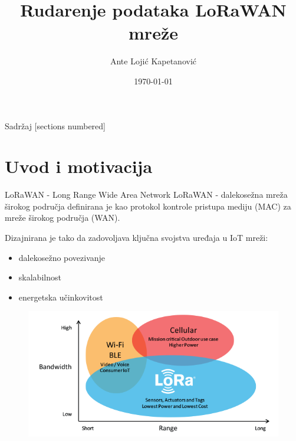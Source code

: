 \documentclass{beamer}
\title{Rudarenje podataka LoRaWAN mreže}
\date{\today}
\author{Ante Lojić Kapetanović}
\institute{FESB, Sveučilište u Splitu}
\begin{document}
  \maketitle

  \begin{frame}{Sadržaj}
    [sections numbered]
    \tableofcontents[hideallsubsections]
  \end{frame}

  \section{Uvod i motivacija}
  \begin{frame}[fragile]{LoRaWAN - Long Range Wide Area Network}
    \alert{LoRaWAN} - dalekosežna mreža širokog područja definirana je kao protokol kontrole pristupa mediju (MAC) za mreže širokog područja (WAN).
    
    Dizajnirana je tako da zadovoljava ključna svojstva uređaja u IoT mreži:
    \begin{itemize}
      \item dalekosežno povezivanje
      \item skalabilnost
      \item energetska učinkovitost
    \end{itemize}
  \end{frame}
  
  \begin{frame}[fragile]
    \begin{center}
      \begin{figure}
        \includegraphics[width=\linewidth]{images/bw_range.png}
      \end{figure}
    \end{center}
  \end{frame}
\end{document}
